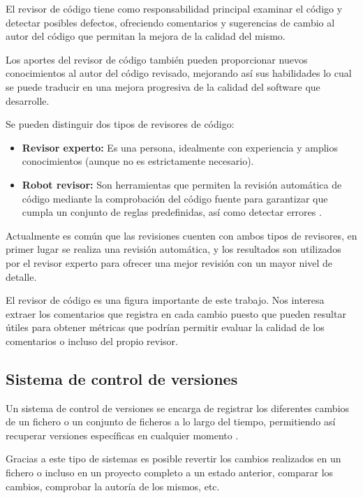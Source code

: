 El revisor de código tiene como responsabilidad principal examinar el código y detectar posibles defectos, ofreciendo comentarios y sugerencias de cambio al autor del código que permitan la mejora de la calidad del mismo.

Los aportes del revisor de código también pueden proporcionar nuevos conocimientos al autor del código revisado, mejorando así sus habilidades lo cual se puede traducir en una mejora progresiva de la calidad del software que desarrolle.

Se pueden distinguir dos tipos de revisores de código:

\begin{itemize}
\tightlist
	\item \textbf{Revisor experto:} Es una persona, idealmente con experiencia y amplios conocimientos (aunque no es estrictamente necesario).
	\item \textbf{Robot revisor:} Son herramientas que permiten la revisión automática de código mediante la comprobación del código fuente para garantizar que cumpla un conjunto de reglas predefinidas, así como detectar errores \cite{wiki:001}.
\end{itemize}

Actualmente es común que las revisiones cuenten con ambos tipos de revisores, en primer lugar se realiza una revisión automática, y los resultados son utilizados por el revisor experto para ofrecer una mejor revisión con un mayor nivel de detalle.

El revisor de código es una figura importante de este trabajo. Nos interesa extraer los comentarios que registra en cada cambio puesto que pueden resultar útiles para obtener métricas que podrían permitir evaluar la calidad de los comentarios o incluso del propio revisor.

\subsection{Sistema de control de versiones}

Un sistema de control de versiones se encarga de registrar los diferentes cambios de un fichero o un conjunto de ficheros a lo largo del tiempo, permitiendo así recuperar versiones específicas en cualquier momento \cite{Chacon:2014:PG:2695634}.

Gracias a este tipo de sistemas es posible revertir los cambios realizados en un fichero o incluso en un proyecto completo a un estado anterior, comparar los cambios, comprobar la autoría de los mismos, etc.

